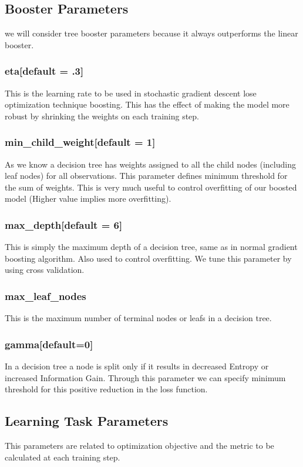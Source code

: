 \subsection{Booster Parameters} we will consider tree booster parameters because
it always outperforms the linear booster.

\subsubsection{eta[default = .3]} This is the learning rate to be used in
stochastic gradient descent lose optimization technique boosting. This has the
effect of making the model more robust by shrinking the weights on each training
step.

\subsubsection{min_child_weight[default = 1]} As we know a decision tree has
weights assigned to all the child nodes (including leaf nodes) for all
observations. This parameter defines minimum threshold for the sum of weights.
This is very much useful to control overfitting of our boosted model  (Higher
value implies more overfitting).

\subsubsection{max_depth[default = 6]} This is simply the maximum depth of a
decision tree, same as in normal gradient boosting algorithm. Also used to
control overfitting. We tune this parameter by using cross validation.

\subsubsection{max_leaf_nodes}
This is the maximum number of terminal nodes or leafs in a decision tree.

\subsubsection{gamma[default=0]} In a decision tree a node is split only if it
results in decreased Entropy or increased Information Gain. Through this
parameter  we can specify minimum threshold for this positive reduction in the
loss function.

\subsection{Learning Task Parameters} This parameters are related to
optimization objective and the metric to be calculated at each training step.

